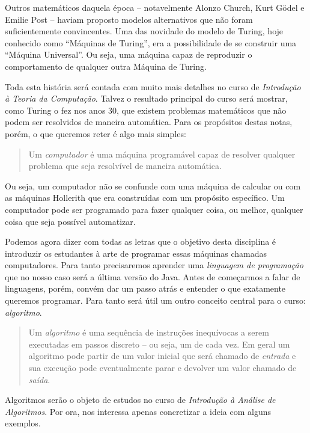 Outros matemáticos daquela época -- notavelmente Alonzo Church, Kurt Gödel e Emilie Post -- haviam proposto modelos alternativos que não foram suficientemente convincentes.
Uma das novidade do modelo de Turing, hoje conhecido como ``Máquinas de Turing'', era a possibilidade de se construir uma ``Máquina Universal''.
Ou seja, uma máquina capaz de reproduzir o comportamento de qualquer outra Máquina de Turing.

Toda esta história será contada com muito mais detalhes no curso de {\em Introdução à Teoria da Computação}.
Talvez o resultado principal do curso será mostrar, como Turing o fez nos anos 30, que existem problemas matemáticos que não podem ser resolvidos de maneira automática.
Para os propósitos destas notas, porém, o que queremos reter é algo mais simples:

\begin{quote}
  Um {\em computador} é uma máquina programável capaz de resolver qualquer problema que seja resolvível de maneira automática.
\end{quote}

Ou seja, um computador não se confunde com uma máquina de calcular ou com as máquinas Hollerith que era construídas com um propósito específico.
Um computador pode ser programado para fazer qualquer coisa, ou melhor, qualquer coisa que seja possível automatizar.

Podemos agora dizer com todas as letras que o objetivo desta disciplina é introduzir os estudantes à arte de programar essas máquinas chamadas computadores.
Para tanto precisaremos aprender uma {\em linguagem de programação} que no nosso caso será a última versão do Java.
Antes de começarmos a falar de linguagens, porém, convém dar um passo atrás e entender o que exatamente queremos programar.
Para tanto será útil um outro conceito central para o curso: {\em algoritmo}.


\begin{quote}
  Um {\em algoritmo} é uma sequência de instruções inequívocas a serem executadas em passos discreto -- ou seja, um de cada vez.
  Em geral um algoritmo pode partir de um valor inicial que será chamado de {\em entrada} e sua execução pode eventualmente parar e devolver um valor chamado de {\em saída}.
\end{quote}

Algoritmos serão o objeto de estudos no curso de {\em Introdução à Análise de Algoritmos}.
Por ora, nos interessa apenas concretizar a ideia com alguns exemplos.

